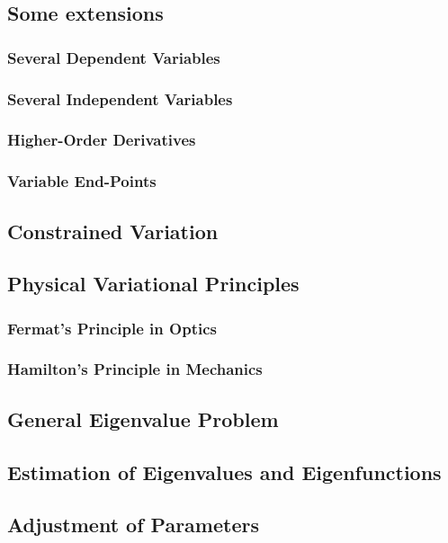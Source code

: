 \subsection{Some extensions}
\subsubsection{Several Dependent Variables}
\subsubsection{Several Independent Variables}
\subsubsection{Higher-Order Derivatives}
\subsubsection{Variable End-Points}
\subsection{Constrained Variation}
\subsection{Physical Variational Principles}
\subsubsection{Fermat's Principle in Optics}
\subsubsection{Hamilton's Principle in Mechanics}
\subsection{General Eigenvalue Problem}
\subsection{Estimation of Eigenvalues and Eigenfunctions}
\subsection{Adjustment of Parameters}
